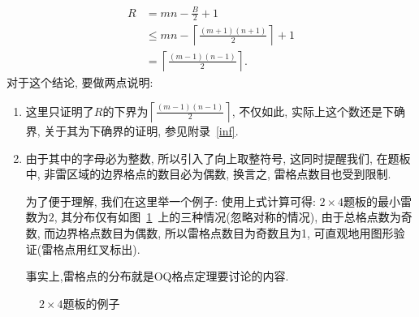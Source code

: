 \documentclass{ctexart}
\newcommand{\varible}[1]{{\Noto[#1]}}
\newcommand{\redcross}[2]{
    \begin{scope}[thick,color = red,shift={(#1,#2)}]
        \draw (0.05,-0.05) -- (-0.05,0.05);
        \draw (-0.05,-0.05) -- (0.05,0.05);
    \end{scope}
}
\begin{document}
\begin{align}
    R &= mn - \frac{B}{2} + 1 \nonumber\\ 
      &\leqslant mn - \left\lceil \frac{(m+1)(n+1)}{2} \right\rceil + 1 \nonumber\\
      &= \left\lceil \frac{(m-1)(n-1)}{2} \right\rceil.
\end{align}
对于这个结论, 要做两点说明:
\begin{enumerate}
    \item 这里只证明了$R$的下界为$\left\lceil \frac{(m-1)(n-1)}{2} \right\rceil$, 不仅如此, 实际上这个数还是下确界, 关于其为下确界的证明, 参见附录\ \ref{inf}.
    \item 由于其中的字母必为整数, 所以引入了向上取整符号, 这同时提醒我们, 在\varible{O}\varible{Q}题板中, 非雷区域的边界格点的数目必为偶数, 换言之, 雷格点数目也受到限制.
    
    为了便于理解, 我们在这里举一个例子: 使用上式计算可得: $2\times4$题板的最小雷数为$2$, 其分布仅有如图\ \ref{example}\ 上的三种情况(忽略对称的情况), 由于总格点数为奇数, 而边界格点数目为偶数, 所以雷格点数目为奇数且为1, 可直观地用图形验证(雷格点用红叉标出).

    事实上,雷格点的分布就是OQ格点定理要讨论的内容.
\end{enumerate}
\begin{figure}[ht]
    \centering
    \quad
    \quad
    \caption{$2\times4$题板的例子}
    \label{example}
\end{figure}
\end{document}
